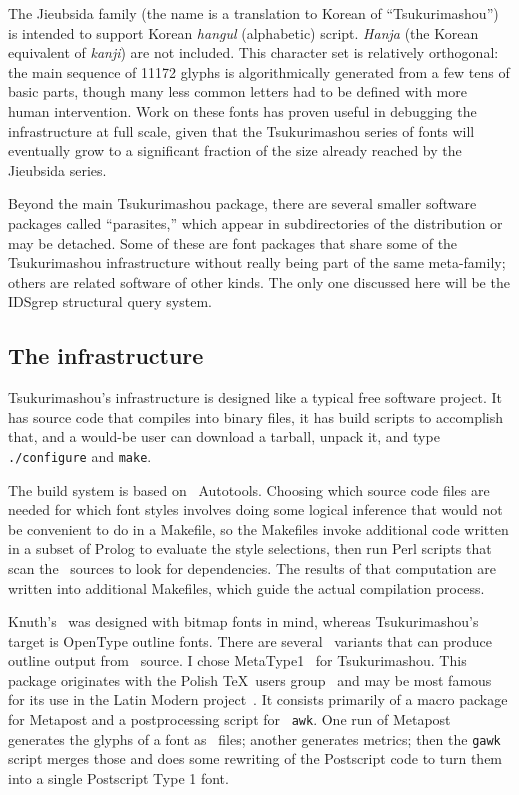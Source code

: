 \documentclass{ltugboat}
\begin{document}
The Jieubsida family (the name is a translation to Korean of
``Tsukurimashou'') is intended to support Korean \emph{hangul} (alphabetic)
script.  \emph{Hanja} (the Korean equivalent of \emph{kanji}) are not
included.  This character set is relatively orthogonal: the main sequence of
11172 glyphs is algorithmically generated from a few tens of basic parts,
though many less common letters had to be defined with more human
intervention.  Work on these fonts has proven useful in debugging the
infrastructure at full scale, given that the Tsukurimashou series of fonts
will eventually grow to a significant fraction of the size already reached
by the Jieubsida series.

Beyond the main Tsukurimashou package, there are several smaller software
packages called ``parasites,'' which appear in subdirectories of the
distribution or may be detached.  Some of these are font packages that share
some of the Tsukurimashou infrastructure without really being part of the
same meta-family; others are related software of other kinds.  The only one
discussed here will be the IDSgrep structural query system.

\subsection{The infrastructure}

Tsukurimashou's infrastructure is designed like a typical free software
project.  It has source code that compiles into binary files, it has build
scripts to accomplish that, and a would-be user can download a tarball,
unpack it, and type \texttt{./configure} and \texttt{make}.

The build system is based on \GNU\ Autotools.  Choosing which source code
files are needed for which font styles involves doing some logical inference
that would not be convenient to do in a Makefile, so the Makefiles invoke
additional code written in a subset of Prolog to evaluate the style
selections, then run Perl scripts that scan the \MF\ sources to look for
dependencies.  The results of that computation are written into additional
Makefiles, which guide the actual compilation process.

Knuth's \MF\ was designed with bitmap fonts in mind, whereas Tsukurimashou's
target is OpenType outline fonts.  There are several \MF\ variants that can
produce outline output from \MF\ source.  I chose
MetaType1~\cite{Jackowski:Programming} for
Tsukurimashou.  This package originates with the Polish \TeX\ users group
\ and may be most famous for its use in the Latin Modern
project~\cite{Jackowski:Latin}.  It consists
primarily of a macro package for Metapost and a postprocessing script for
\GNU\ \texttt{awk}.  One run of Metapost generates the glyphs of a font as
\EPS\ files; another generates metrics; then the \texttt{gawk} script merges
those and does some rewriting of the Postscript code to turn them into a
single Postscript Type 1 font.
\end{document}
